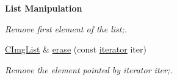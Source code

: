 \begin{Indent}{\bf List Manipulation}
\begin{DoxyCompactItemize}
\begin{DoxyCompactList}\small\item\em Remove first element of the list;. \end{DoxyCompactList}\item 
\hypertarget{structcimg__library_1_1_c_img_list_a9d62e109a750ec4ca12b1efe37746efb}{\hyperlink{structcimg__library_1_1_c_img_list}{C\-Img\-List} \& \hyperlink{structcimg__library_1_1_c_img_list_a9d62e109a750ec4ca12b1efe37746efb}{erase} (const \hyperlink{structcimg__library_1_1_c_img_list_ac4e7d5d973678ecd8250aa7eff9b9c98}{iterator} iter)}\label{structcimg__library_1_1_c_img_list_a9d62e109a750ec4ca12b1efe37746efb}

\begin{DoxyCompactList}\small\item\em Remove the element pointed by iterator {\ttfamily iter};. \end{DoxyCompactList}\end{DoxyCompactItemize}
\end{Indent}
